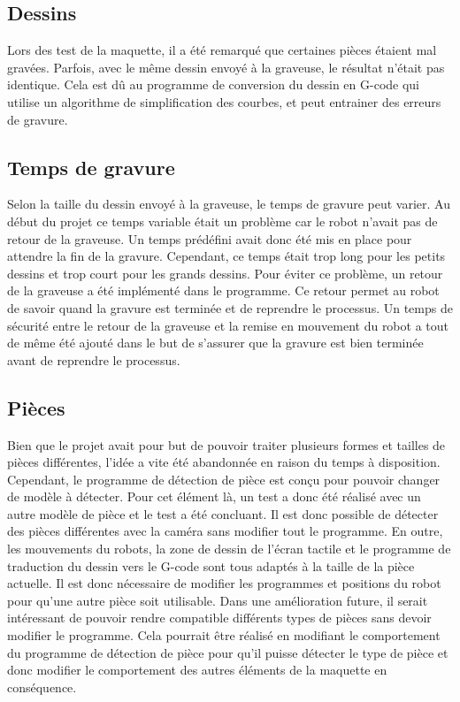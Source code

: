 \subsection{Dessins}
Lors des test de la maquette, il a été remarqué que certaines pièces étaient mal gravées. Parfois, avec le même dessin envoyé à la graveuse, le résultat n'était pas identique. Cela est dû au programme de conversion du dessin en G-code qui utilise un algorithme de simplification des courbes, et peut entrainer des erreurs de gravure.

\subsection{Temps de gravure}
Selon la taille du dessin envoyé à la graveuse, le temps de gravure peut varier. Au début du projet ce temps variable était un problème car le robot n'avait pas de retour de la graveuse. Un temps prédéfini avait donc été mis en place pour attendre la fin de la gravure. Cependant, ce temps était trop long pour les petits dessins et trop court pour les grands dessins. Pour éviter ce problème, un retour de la graveuse a été implémenté dans le programme. Ce retour permet au robot de savoir quand la gravure est terminée et de reprendre le processus. Un temps de sécurité entre le retour de la graveuse et la remise en mouvement du robot a tout de même été ajouté dans le but de s'assurer que la gravure est bien terminée avant de reprendre le processus.

\subsection{Pièces}
Bien que le projet avait pour but de pouvoir traiter plusieurs formes et tailles de pièces différentes, l'idée a vite été abandonnée en raison du temps à disposition. Cependant, le programme de détection de pièce est conçu pour pouvoir changer de modèle à détecter. Pour cet élément là, un test a donc été réalisé avec un autre modèle de pièce et le test a été concluant. Il est donc possible de détecter des pièces différentes avec la caméra sans modifier tout le programme. En outre, les mouvements du robots, la zone de dessin de l'écran tactile et le programme de traduction du dessin vers le G-code sont tous adaptés à la taille de la pièce actuelle. Il est donc nécessaire de modifier les programmes et positions du robot pour qu'une autre pièce soit utilisable. Dans une amélioration future, il serait intéressant de pouvoir rendre compatible différents types de pièces sans devoir modifier le programme. Cela pourrait être réalisé en modifiant le comportement du programme de détection de pièce pour qu'il puisse détecter le type de pièce et donc modifier le comportement des autres éléments de la maquette en conséquence.

